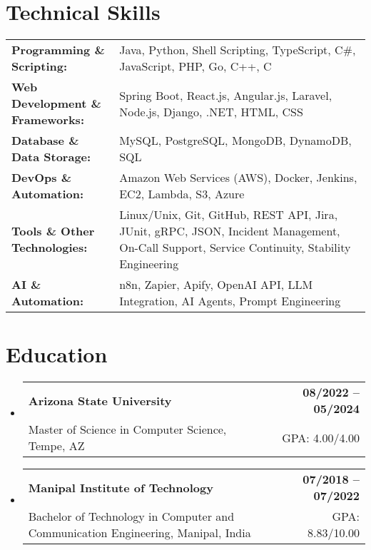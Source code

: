 \documentclass[letterpaper,11pt]{article}
\makeatletter
\newcommand{\educationSubheading}[4]{
  \vspace{-2pt}\item
    \begin{tabular*}{1.0\textwidth}[t]{l@{\extracolsep{\fill}}r}
      \textbf{\small #1} & \textbf{\small #2} \\
      {\small#3} & {\small #4} \\
    \end{tabular*}\vspace{-7pt}
}
\newcommand{\resumeSubHeadingListStart}{\begin{itemize}[leftmargin=0pt, label={}]}
\newcommand{\resumeSubHeadingListEnd}{\end{itemize}}
\makeatother
\begin{document}
\section{Technical Skills}
        \vspace{-14pt}
        \begin{table}[h]
            \footnotesize
            \begin{tabular}{p{0.3\linewidth} p{0.7\linewidth}}
                \textbf{Programming \& Scripting:} & Java, Python, Shell Scripting, TypeScript, C\#, JavaScript, PHP, Go, C++, C \\
                \textbf{Web Development \& Frameworks:} & Spring Boot, React.js, Angular.js, Laravel, Node.js, Django, .NET, HTML, CSS \\
                \textbf{Database \& Data Storage:} & MySQL, PostgreSQL, MongoDB, DynamoDB, SQL \\
                \textbf{DevOps \& Automation:} & Amazon Web Services (AWS), Docker, Jenkins, EC2, Lambda, S3, Azure \\
                \textbf{Tools \& Other Technologies:} & Linux/Unix, Git, GitHub, REST API, Jira, JUnit, gRPC, JSON, Incident Management, On-Call Support, Service Continuity, Stability Engineering \\
                \textbf{AI \& Automation:} & n8n, Zapier, Apify, OpenAI API, LLM Integration, AI Agents, Prompt Engineering \\
            \end{tabular}
        \end{table}

 \vspace{-15pt}

\section{Education}
  \resumeSubHeadingListStart
    \educationSubheading
      {Arizona State University}{08/2022 -- 05/2024}
      {Master of Science in Computer Science, Tempe, AZ}{GPA: 4.00/4.00}

    \educationSubheading
      {Manipal Institute of Technology}{07/2018 -- 07/2022}
      {Bachelor of Technology in Computer and Communication Engineering, Manipal, India}{GPA: 8.83/10.00}
  \resumeSubHeadingListEnd
\end{document}
